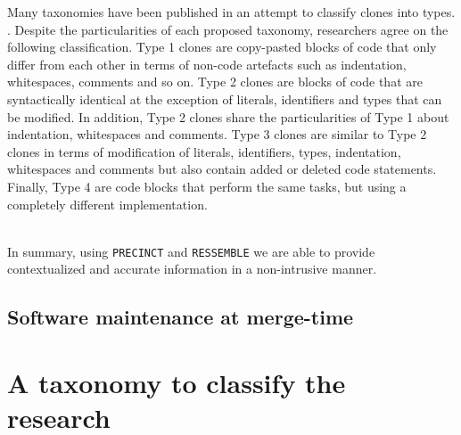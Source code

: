 Many taxonomies have been published in an attempt to classify clones into types. \cite{Mayrand1996,Balazinska1999,Koschke2006,Bellon2007,Kontogiannis,Kapser}.
Despite the particularities of each proposed taxonomy, researchers agree on the following classification.
Type 1 clones are copy-pasted blocks of code that only differ from each other in terms of non-code artefacts such as indentation, whitespaces, comments and so on.
Type 2 clones are blocks of code that are syntactically identical at the exception of literals, identifiers and types that can be modified.
In addition, Type 2 clones share the particularities of Type 1 about indentation, whitespaces and comments.
Type 3 clones are similar to Type 2 clones in terms of modification of literals, identifiers, types, indentation, whitespaces and comments but also contain added or deleted code statements.
Finally, Type 4 are code blocks that perform the same tasks, but using a completely different implementation.




\\

In summary, using {\tt PRECINCT} and {\tt RESSEMBLE} we are able to provide contextualized and accurate information in a non-intrusive manner.

\section{Software maintenance at merge-time}



\chapter{A taxonomy to classify the research}


